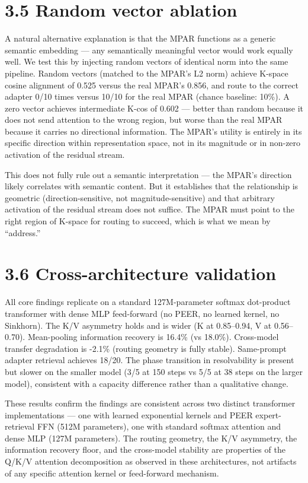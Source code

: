 \section{3.5 Random vector ablation}\label{random-vector-ablation}

A natural alternative explanation is that the MPAR functions as a generic semantic embedding --- any semantically meaningful vector would work equally well. We test this by injecting random vectors of identical norm into the same pipeline. Random vectors (matched to the MPAR's L2 norm) achieve K-space cosine alignment of 0.525 versus the real MPAR's 0.856, and route to the correct adapter 0/10 times versus 10/10 for the real MPAR (chance baseline: 10\%). A zero vector achieves intermediate K-cos of 0.602 --- better than random because it does not send attention to the wrong region, but worse than the real MPAR because it carries no directional information. The MPAR's utility is entirely in its specific direction within representation space, not in its magnitude or in non-zero activation of the residual stream.

This does not fully rule out a semantic interpretation --- the MPAR's direction likely correlates with semantic content. But it establishes that the relationship is geometric (direction-sensitive, not magnitude-sensitive) and that arbitrary activation of the residual stream does not suffice. The MPAR must point to the right region of K-space for routing to succeed, which is what we mean by ``address.''

\section{3.6 Cross-architecture validation}\label{cross-architecture-validation}

All core findings replicate on a standard 127M-parameter softmax dot-product transformer with dense MLP feed-forward (no PEER, no learned kernel, no Sinkhorn). The K/V asymmetry holds and is wider (K at 0.85--0.94, V at 0.56--0.70). Mean-pooling information recovery is 16.4\% (vs 18.0\%). Cross-model transfer degradation is -2.1\% (routing geometry is fully stable). Same-prompt adapter retrieval achieves 18/20. The phase transition in resolvability is present but slower on the smaller model (3/5 at 150 steps vs 5/5 at 38 steps on the larger model), consistent with a capacity difference rather than a qualitative change.

These results confirm the findings are consistent across two distinct transformer implementations --- one with learned exponential kernels and PEER expert-retrieval FFN (512M parameters), one with standard softmax attention and dense MLP (127M parameters). The routing geometry, the K/V asymmetry, the information recovery floor, and the cross-model stability are properties of the Q/K/V attention decomposition as observed in these architectures, not artifacts of any specific attention kernel or feed-forward mechanism.

